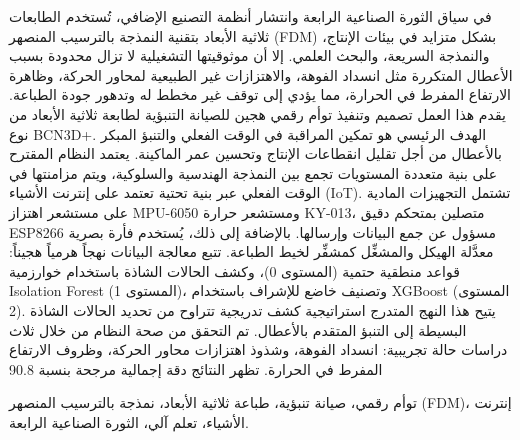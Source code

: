 \begin{abstractAr}
في سياق الثورة الصناعية الرابعة وانتشار أنظمة التصنيع الإضافي، تُستخدم الطابعات ثلاثية الأبعاد بتقنية النمذجة بالترسيب المنصهر (FDM) بشكل متزايد في بيئات الإنتاج، والنمذجة السريعة، والبحث العلمي. إلا أن موثوقيتها التشغيلية لا تزال محدودة بسبب الأعطال المتكررة مثل انسداد الفوهة، والاهتزازات غير الطبيعية لمحاور الحركة، وظاهرة الارتفاع المفرط في الحرارة، مما يؤدي إلى توقف غير مخطط له وتدهور جودة الطباعة.
يقدم هذا العمل تصميم وتنفيذ توأم رقمي هجين للصيانة التنبؤية لطابعة ثلاثية الأبعاد من نوع BCN3D+. الهدف الرئيسي هو تمكين المراقبة في الوقت الفعلي والتنبؤ المبكر بالأعطال من أجل تقليل انقطاعات الإنتاج وتحسين عمر الماكينة.
يعتمد النظام المقترح على بنية متعددة المستويات تجمع بين النمذجة الهندسية والسلوكية، ويتم مزامنتها في الوقت الفعلي عبر بنية تحتية تعتمد على إنترنت الأشياء (IoT). تشتمل التجهيزات المادية على مستشعر اهتزاز MPU-6050 ومستشعر حرارة KY-013، متصلين بمتحكم دقيق ESP8266 مسؤول عن جمع البيانات وإرسالها. بالإضافة إلى ذلك، يُستخدم فأرة بصرية معدَّلة الهيكل والمشغِّل كمشفِّر لخيط الطباعة.
تتبع معالجة البيانات نهجاً هرمياً هجيناً: قواعد منطقية حتمية (المستوى 0)، وكشف الحالات الشاذة باستخدام خوارزمية Isolation Forest (المستوى 1)، وتصنيف خاضع للإشراف باستخدام XGBoost (المستوى 2). يتيح هذا النهج المتدرج استراتيجية كشف تدريجية تتراوح من تحديد الحالات الشاذة البسيطة إلى التنبؤ المتقدم بالأعطال.
تم التحقق من صحة النظام من خلال ثلاث دراسات حالة تجريبية: انسداد الفوهة، وشذوذ اهتزازات محاور الحركة، وظروف الارتفاع المفرط في الحرارة. تظهر النتائج دقة إجمالية مرجحة بنسبة 90.8%
\end{abstractAr}

\begin{keywordsAr}
توأم رقمي، صيانة تنبؤية، طباعة ثلاثية الأبعاد، نمذجة بالترسيب المنصهر (FDM)، إنترنت الأشياء، تعلم آلي، الثورة الصناعية الرابعة.
\end{keywordsAr}